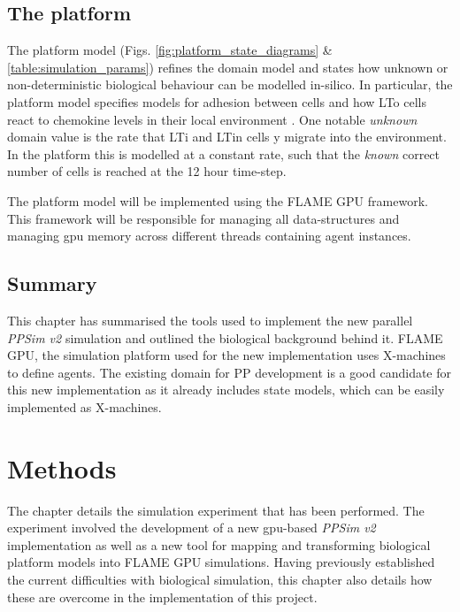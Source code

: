 \documentclass{UoYCSproject}
\begin{document}
\section{The \gls{platform}}
\label{platform}
The platform model (Figs. \ref{fig:platform_state_diagrams} \& \ref{table:simulation_params}) refines the domain model and states how unknown or non-deterministic biological behaviour can be modelled \gls{in-silico}.
In particular, the platform model specifies models for adhesion between cells and how \gls{LTo} cells react to chemokine levels in their local environment \cite{kieran_thesis, kieran_methodology}.
One notable \textit{unknown} domain value is the rate that \gls{LTi} and \gls{LTin} cells y migrate into the environment.
In the \gls{platform} this is modelled at a constant rate, such that the \textit{known} correct number of cells is reached at the 12 hour time-step.

The platform model will be implemented using the \gls{FLAME GPU} framework.
This framework will be responsible for managing all data-structures and managing \gls{gpu} memory across different threads containing agent instances.

\section{Summary}
This chapter has summarised the tools used to implement the new parallel \textit{PPSim v2} simulation and outlined the biological background behind it.
\gls{FLAME GPU}, the simulation platform used for the new implementation uses X-machines \cite{xmachines} to define agents.
The existing \gls{domain} for \gls{PP} development is a good candidate for this new implementation as it already includes state models, which can be easily implemented as X-machines.

\chapter{Methods}
\label{methods}

The chapter details the simulation experiment that has been performed.
The experiment involved the development of a new \acrshort{gpu}-based \textit{PPSim v2} implementation as well as a new tool for mapping and transforming biological platform models into \gls{FLAME GPU} simulations.
Having previously established the current difficulties with biological simulation, this chapter also details how these are overcome in the implementation of this project.
\end{document}
